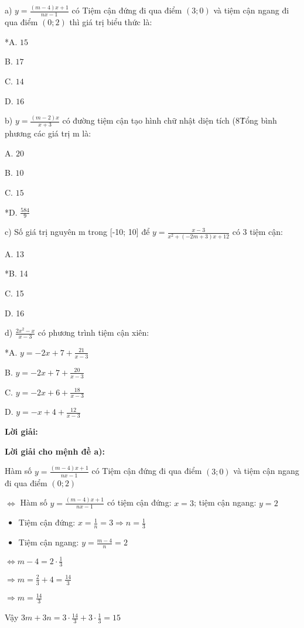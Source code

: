 \documentclass{article}
\begin{document}
a) \(y = \frac{(m - 4)x + 1}{nx - 1}\) có Tiệm cận đứng đi qua điểm \((3; 0)\) và tiệm cận ngang đi qua điểm \((0; 2)\) thì giá trị biểu thức là:

*A. \(15\)

B. \(17\)

C. \(14\)

D. \(16\)


b) \(y = \frac{(m - 2)x}{x + 3}\) có đường tiệm cận tạo hình chữ nhật diện tích (8\. Tổng bình phương các giá trị m là:

A. \(20\)

B. \(10\)

C. \(15\)

*D. \(\frac{584}{9}\)


c) Số giá trị nguyên m trong [-10; 10] để \(y = \frac{x - 3}{x^2 + (-2m + 3)x + 12}\) có 3 tiệm cận:

A. 13

*B. 14

C. 15

D. 16


d) \(\frac{2x^2 - x}{x - 3}\) có phương trình tiệm cận xiên:

*A. \(y = -2x + 7 + \frac{21}{x - 3}\)

B. \(y = -2x + 7 + \frac{20}{x - 3}\)

C. \(y = -2x + 6 + \frac{18}{x - 3}\)

D. \(y = -x + 4 + \frac{12}{x - 3}\)


\textbf{Lời giải:}

\textbf{Lời giải cho mệnh đề a):}

Hàm số \(y = \frac{(m - 4)x + 1}{nx - 1}\) có Tiệm cận đứng đi qua điểm \((3; 0)\) và tiệm cận ngang đi qua điểm \((0; 2)\)

\(\Leftrightarrow\) Hàm số \(y = \frac{(m - 4)x + 1}{nx - 1}\) có tiệm cận đứng: \(x = 3\); tiệm cận ngang: \(y = 2\)

\begin{itemize}
\item Tiệm cận đứng:
\(x = \frac{1}{n} = 3 \Rightarrow n = \frac{1}{3}\)
\item Tiệm cận ngang:
\(y = \frac{m - 4}{n} = 2\)
\end{itemize}

\(\Leftrightarrow m - 4 = 2 \cdot \frac{1}{3}\)

\(\Rightarrow m = \frac{2}{3} + 4 = \frac{14}{3}\)

\(\Rightarrow m = \frac{14}{3}\)

Vậy \(3m + 3n = 3 \cdot \frac{14}{3} + 3 \cdot \frac{1}{3} = 15\)
\end{document}
